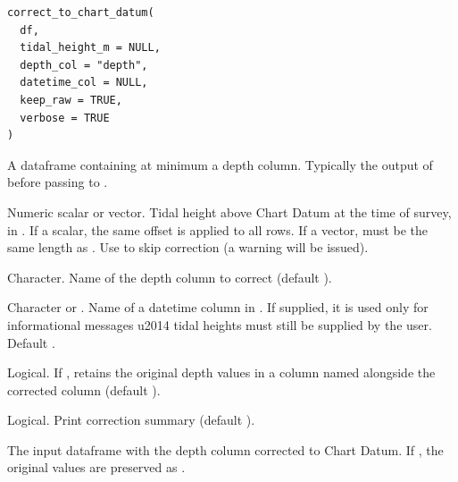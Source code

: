 \documentclass[a4paper]{book}
\begin{document}
%
\begin{Usage}
\begin{verbatim}
correct_to_chart_datum(
  df,
  tidal_height_m = NULL,
  depth_col = "depth",
  datetime_col = NULL,
  keep_raw = TRUE,
  verbose = TRUE
)
\end{verbatim}
\end{Usage}
%
\begin{Arguments}
\begin{ldescription}
\item[\code{df}] A dataframe containing at minimum a depth column. Typically the
output of  before passing to .

\item[\code{tidal\_height\_m}] Numeric scalar or vector. Tidal height above Chart
Datum at the time of survey, in . If a scalar, the same offset
is applied to all rows. If a vector, must be the same length as .
Use  to skip correction (a warning will be issued).

\item[\code{depth\_col}] Character. Name of the depth column to correct
(default ).

\item[\code{datetime\_col}] Character or . Name of a datetime column in .
If supplied, it is used only for informational messages \bsl{}u2014 tidal heights
must still be supplied by the user. Default .

\item[\code{keep\_raw}] Logical. If , retains the original depth values in a
column named  alongside the corrected  column
(default ).

\item[\code{verbose}] Logical. Print correction summary (default ).
\end{ldescription}
\end{Arguments}
%
\begin{Value}
The input dataframe with the depth column corrected to Chart Datum.
If , the original values are preserved as .
\end{Value}
%
\begin{Examples}
\end{Examples}
\end{document}
